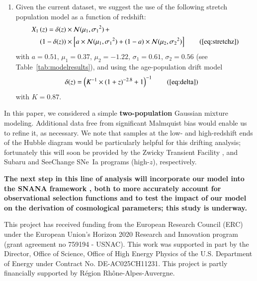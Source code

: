\documentclass[]{aa}
\begin{document}
\begin{enumerate}
    \item Given the current dataset, we suggest the use of the following stretch
        population model as a function of redshift:
        \begin{align*}
        \label{eqconclusion:stretchz}
            X_1\left(z \right) =
            \delta(z)&\times\mathcal{N}(\mu_1,\sigma_1{}^2)\,+\nonumber\\
            (1-\delta(z))&\times \left[a\times\mathcal{N}(\mu_1,\sigma_1{}^2) +
            (1-a)\times\mathcal{N}(\mu_2,\sigma_2{}^2)\right]
            \tag{\ref{eq:stretchz}}
        \end{align*}
        with $a=0.51$, $\mu_1=0.37$, $\mu_2=-1.22$, $\sigma_1=0.61$,
        $\sigma_2=0.56$ (see Table~\ref{tab:modelresults}), and using the
        age-population drift model \begin{align*}
            \delta(z) & = \left( K^{-1} \times (1+z)^{-2.8} +1 \right)^{-1}
            \tag{\ref{eq:delta}}
        \end{align*}
        with $K=0.87$.
\end{enumerate}

In this paper, we considered a simple \textbf{two-population} Gaussian mixture
modeling. Additional data free from significant Malmquist bias would enable
us to refine it, as necessary. We note that samples at the low- and high-redshift
ends of the Hubble diagram would be particularly helpful for this drifting
analysis; fortunately this will soon be provided by the Zwicky Transient
Facility \citep[low-$z$,][]{bellm2019, graham2019}, and Subaru and SeeChange
SNe~Ia programs (high-$z$), respectively. 

\textbf{The next step in this line of analysis will incorporate our model into
the SNANA framework \citep{SNANA}, both to more accurately account for
observational selection functions and to test the impact of our model on the
derivation of cosmological parameters; this study is underway.}

\begin{acknowledgements}
    This project has received funding from the European Research Council (ERC)
    under the European Union's Horizon 2020 Research and Innovation program
    (grant agreement no 759194 - USNAC).
    This work was supported in part by the Director, Office of Science, Office
    of High Energy Physics of the U.S. Department of Energy under Contract No.
    DE-AC025CH11231.
    This project is partly financially supported by Région Rhône-Alpes-Auvergne.
\end{acknowledgements}
\end{document}
